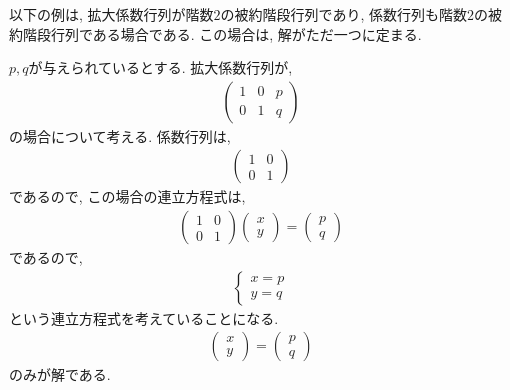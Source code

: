 以下の例は,
拡大係数行列が階数$2$の被約階段行列であり,
係数行列も階数$2$の被約階段行列である場合である.
この場合は,
解がただ一つに定まる.
\begin{example}
  \label{eg:eq:reduced:1}
  $p,q$が与えられているとする.
  拡大係数行列が,
  \begin{align*}
    \begin{pmatrix}
      1&0&p\\0&1&q
    \end{pmatrix}
  \end{align*}
  の場合について考える.
  係数行列は,
  \begin{align*}
    \begin{pmatrix}
      1&0\\0&1
    \end{pmatrix}
  \end{align*}
  であるので, この場合の連立方程式は,
  \begin{align*}
    \begin{pmatrix}
      1&0\\0&1
    \end{pmatrix}
    \begin{pmatrix}x\\y\end{pmatrix}
      =
      \begin{pmatrix}
        p\\q
      \end{pmatrix}
  \end{align*}
  であるので,
  \begin{align*}
    \begin{cases}
      x=p\\
      y=q
    \end{cases}
  \end{align*}
  という連立方程式を考えていることになる.
  \begin{align*}
    \begin{pmatrix}x\\y\end{pmatrix}
      =
      \begin{pmatrix}p\\q\end{pmatrix}
  \end{align*}
  のみが解である.
\end{example}

